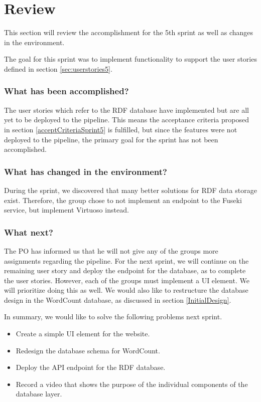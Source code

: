 \section{Review}
This section will review the accomplishment for the 5th sprint as well as changes in the \knox{} environment. 

The goal for this sprint was to implement functionality to support the user stories defined in section \ref{sec:userstories5}. 

\subsubsection*{What has been accomplished?}
The user stories which refer to the RDF database have implemented but are all yet to be deployed to the \knox{} pipeline. This means the acceptance criteria proposed in section \ref{acceptCriteriaSprint5} is fulfilled, but since the features were not deployed to the pipeline, the primary goal for the sprint has not been accomplished. 

\subsubsection*{What has changed in the environment?}
During the sprint, we discovered that many better solutions for RDF data storage exist. Therefore, the group chose to not implement an endpoint to the Fuseki service, but implement Virtuoso instead. 

\subsubsection*{What next?}
The PO has informed us that he will not give any of the \knox{} groups more assignments regarding the pipeline. 
For the next sprint, we will continue on the remaining user story and deploy the endpoint for the database, as to complete the user stories. 
However, each of the \knox{} groups must implement a UI element. We will prioritize doing this as well.
We would also like to restructure the database design in the WordCount database, as discussed in section \ref{InitialDesign}.


In summary, we would like to solve the following problems next sprint.

\begin{itemize}
    \item Create a simple UI element for the \knox{} website.
    \item Redesign the database schema for WordCount.
    \item Deploy the API endpoint for the RDF database.
    \item Record a video that shows the purpose of the individual components of the database layer.
\end{itemize}
